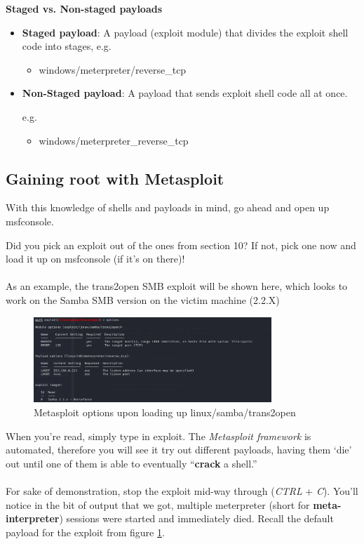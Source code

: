 \documentclass[a4paper,11pt]{article}
\renewcommand{\tt}[2][tt]{\textcolor{#1}{\ttfamily #2}}%
\begin{document}
\begin{center}
{\bfseries Staged vs. Non-staged payloads}
\end{center}
\begin{itemize}
    \item {\bfseries Staged payload}: A payload (exploit module) that divides the exploit shell code into stages, e.g.
    \begin{itemize}
        \item \tt{windows/meterpreter/reverse\_tcp}
    \end{itemize}
    \item {\bfseries Non-Staged payload}: A payload that sends exploit shell code all at once.
    
    e.g.
    \begin{itemize}
        \item \tt{windows/meterpreter\_reverse\_tcp}
    \end{itemize}
\end{itemize}
\pagebreak

\subsection{Gaining root with Metasploit}
With this knowledge of shells and payloads in mind, go ahead and open up \tt{msfconsole}.

Did you pick an exploit out of the ones from section 10? If not, pick one now and load it up on \tt{msfconsole} (if it's on there)!
\\
\\
As an example, the \tt{trans2open} SMB exploit will be shown here, which looks to work on the Samba SMB version on the victim machine (2.2.X)

\begin{figure}[h]
    \centering
    \includegraphics[width=0.8\textwidth]{images/trans2openoptions.png}
    \caption{Metasploit options upon loading up \tt{linux/samba/trans2open}}
    \label{fig:trans2openoptions}
\end{figure}

When you're read, simply type in \tt{exploit}. The \textit{Metasploit framework} is automated, therefore you will see it try out different payloads, having them `die' out until one of them is able to eventually ``{\bfseries crack} a shell.''
\\
\\
For sake of demonstration, stop the \tt{exploit} mid-way through (\textit{CTRL} + \textit{C}). You'll notice in the bit of output that we got, multiple \tt{meterpreter} (short for {\bfseries meta-interpreter}) sessions were started and immediately died. Recall the default payload for the exploit from figure {\ref{fig:trans2openoptions}}.
\end{document}
